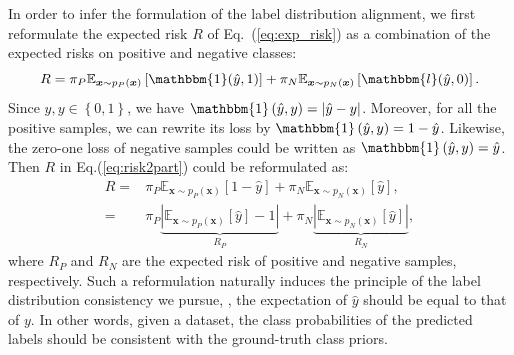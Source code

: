 \documentclass[final]{cvpr}
\newcommand{\examplex}{\bm{x}}
\newcommand{\expectation}[1]{\mathbb{E}_{#1}}
\newcommand{\zeronerror}{\mathbbm{1}\left(\hat{y}, y\right)}
\newcommand{\bangyan}[1]{#1}
\begin{document}
In order to infer the formulation of the label distribution alignment, we first reformulate the expected risk $R$ of Eq.~(\ref{eq:exp_risk}) as a combination of the expected risks on positive and negative classes:
\begin{equation}
    R =  \pi_{P} \expectation{\examplex \sim p_{P}(\examplex)} \left[ \mathbbm{1}(\hat{y},1) \right] 
       + \pi_{N} \expectation{\examplex \sim p_{N}(\examplex)} \left[ \mathbbm{l}(\hat{y},0) \right]. \label{eq:risk2part}
\end{equation}
\bangyan{Since $\hat{y},y \in \left\{ 0,1 \right\}$, we have  $\zeronerror = \left| \hat{y}-y \right| $. Moreover, for  all the positive samples, we can rewrite its loss by $\zeronerror=1-\hat{y}$. Likewise, the zero-one loss of negative samples could be written as $\zeronerror=\hat{y}$.} Then $R$ in Eq.(\ref{eq:risk2part}) \bangyan{could be reformulated as}:
\begin{align}
     R = & \pi_{P} \expectation{\examplex \sim p_{P}(\examplex)} \left[ 1-\hat{y} \right] + \pi_{N} \expectation{\examplex \sim p_{N}(\examplex) } \left[ \hat{y} \right], \nonumber \\
    = & \pi_{P} \underbrace{\left| \expectation{\examplex \sim p_{P}(\examplex)} \left[ \hat{y} \right] - 1 \right|}_{R_{P}} + \pi_{N} \underbrace{\left| \expectation{\examplex \sim p_{N}(\examplex)} \left[ \hat{y} \right] \right|}_{R_{N}}, \label{eq:rprn}
\end{align}
where $R_{P}$ and $R_{N}$ are the expected risk of \bangyan{positive and negative samples,} respectively. \bangyan{Such a reformulation naturally induces} the principle of the label distribution consistency we pursue, \ie, the expectation of $\hat{y}$ should be equal to that of $y$. In other words, given a dataset, the class probabilities of the predicted labels should be consistent with the \bangyan{ground-truth class priors}.
\end{document}
